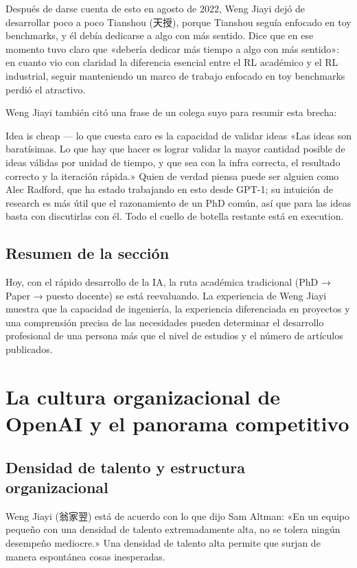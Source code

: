 \documentclass[a4paper]{article}
\begin{document}
Después de darse cuenta de esto en agosto de 2022, Weng Jiayi dejó de desarrollar poco a poco Tianshou (天授), porque Tianshou seguía enfocado en toy benchmarks, y él debía dedicarse a algo con más sentido. Dice que en ese momento tuvo claro que «debería dedicar más tiempo a algo con más sentido»: en cuanto vio con claridad la diferencia esencial entre el RL académico y el RL industrial, seguir manteniendo un marco de trabajo enfocado en toy benchmarks perdió el atractivo.

Weng Jiayi también citó una frase de un colega suyo para resumir esta brecha:

\begin{importantbox}{Idea is cheap --- lo que cuesta caro es la capacidad de validar ideas}
«Las ideas son baratísimas. Lo que hay que hacer es lograr validar la mayor cantidad posible de ideas válidas por unidad de tiempo, y que sea con la infra correcta, el resultado correcto y la iteración rápida.» Quien de verdad piensa puede ser alguien como Alec Radford, que ha estado trabajando en esto desde GPT-1; su intuición de research es más útil que el razonamiento de un PhD común, así que para las ideas basta con discutirlas con él. Todo el cuello de botella restante está en execution.
\end{importantbox}

\subsection{Resumen de la sección}

Hoy, con el rápido desarrollo de la IA, la ruta académica tradicional (PhD → Paper → puesto docente) se está reevaluando. La experiencia de Weng Jiayi muestra que la capacidad de ingeniería, la experiencia diferenciada en proyectos y una comprensión precisa de las necesidades pueden determinar el desarrollo profesional de una persona más que el nivel de estudios y el número de artículos publicados.

\section{La cultura organizacional de OpenAI y el panorama competitivo}

\subsection{Densidad de talento y estructura organizacional}

Weng Jiayi (翁家翌) está de acuerdo con lo que dijo Sam Altman: «En un equipo pequeño con una densidad de talento extremadamente alta, no se tolera ningún desempeño mediocre.» Una densidad de talento alta permite que surjan de manera espontánea cosas inesperadas.
\end{document}
